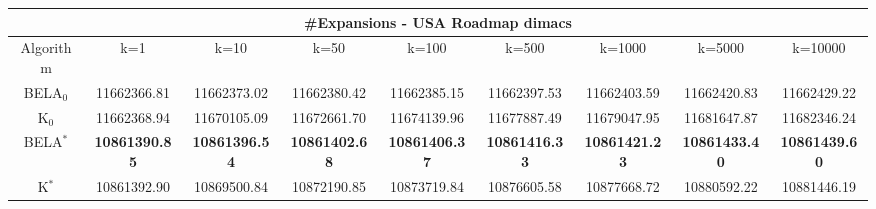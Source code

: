 \begin{tabular}{c|cccccccc}\toprule
\multicolumn{9}{c}{#Expansions - USA Roadmap dimacs}\\ \midrule
Algorithm & k=1 & k=10 & k=50 & k=100 & k=500 & k=1000 & k=5000 & k=10000 \\ \midrule
BELA$_0$ & 11662366.81 & 11662373.02 & 11662380.42 & 11662385.15 & 11662397.53 & 11662403.59 & 11662420.83 & 11662429.22 \\
K$_0$ & 11662368.94 & 11670105.09 & 11672661.70 & 11674139.96 & 11677887.49 & 11679047.95 & 11681647.87 & 11682346.24 \\
BELA$^*$ & \textbf{10861390.85} & \textbf{10861396.54} & \textbf{10861402.68} & \textbf{10861406.37} & \textbf{10861416.33} & \textbf{10861421.23} & \textbf{10861433.40} & \textbf{10861439.60} \\
K$^*$ & 10861392.90 & 10869500.84 & 10872190.85 & 10873719.84 & 10876605.58 & 10877668.72 & 10880592.22 & 10881446.19 \\ \bottomrule 
\end{tabular}
